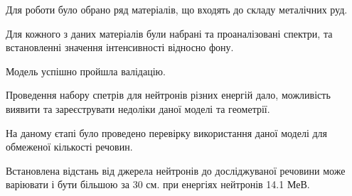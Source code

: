\documentclass[a4paper, 14pt]{article}
\numberwithin{equation}{section}
\numberwithin{table}{section}
\begin{document}
Для роботи було обрано ряд матеріалів, що входять до складу металічних руд.

Для кожного з даних матеріалів були набрані та проаналізовані спектри, та встановленні значення інтенсивності відносно фону. 

Модель успішно пройшла валідацію.  

Проведення набору спетрів для нейтронів різних енергій дало, можливість виявити та зареєструвати недоліки даної моделі та геометрії. 

На даному єтапі було проведено перевірку використання даної моделі для обмеженої кількості речовин. 

Встановлена відстань від джерела нейтронів до досліджуваної речовини може варіювати і бути більшою за 30 см. при енергіях нейтронів 14.1 МеВ.
	
	
\newpage 
\end{document}
